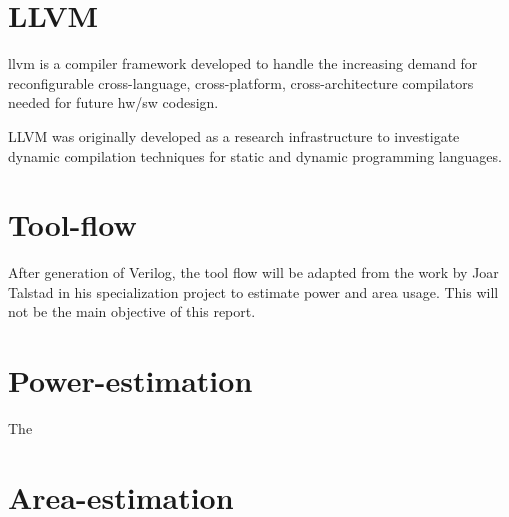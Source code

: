 \section{\label{sec:LLVM}LLVM}

\gls{llvm} is a compiler framework developed to handle the increasing demand for reconfigurable cross-language, cross-platform, cross-architecture compilators needed for future hw/sw codesign.

LLVM was originally developed as a research infrastructure to investigate dynamic compilation techniques for static and dynamic programming languages.

\section{Tool-flow}

After generation of Verilog, the tool flow will be adapted from the work by Joar Talstad in his specialization project \cite{talstad14powest} to estimate power and area usage. This will not be the main objective of this report.

\section{Power-estimation}

The 

\section{Area-estimation}



